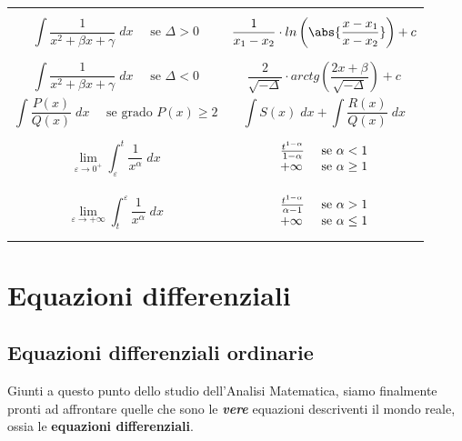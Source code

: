 \documentclass[a4paper, 12pt]{report}
\begin{document}
\begin{tabular}{m{} | m{}}
            
        \[ \int \frac{1}{x^2 + \beta x + \gamma}\; dx
        \quad \text{  se } \Delta > 0\] &
        \[ \frac{1}{x_1-x_2} \cdot ln \left ( \abs{\frac{x-x_1}{x-x_2}} \right )+c \]
        \\
        
            
        \[ \int \frac{1}{x^2 + \beta x + \gamma}\; dx
        \quad \text{ se } \Delta < 0\] &
        \[ \frac{2}{\sqrt{-\Delta}} \cdot arctg \left ( \frac{2x+ \beta}{\sqrt{-\Delta}}\right )+c \] \\
        
        \[\int \frac{P(x)}{Q(x)}\; dx
        \quad \text{ se grado } P(x) \geq 2\] &
        \[ \int S(x) \; dx + \int \frac{R(x)}{Q(x)} \; dx \] \\
        
        \[ \lim_{\varepsilon \to 0^+} \int_{\varepsilon}^{t} \frac{1}{x^{\alpha}} \; dx \] &
        $$
        \left . \begin{array}{l l}
                \frac{t^{1-\alpha}}{1-\alpha} & \text{ se } \alpha < 1 \\
                +\infty & \text{ se } \alpha \geq 1
        \end{array} \right .
        $$ \\
        
        \[ \lim_{\varepsilon \to +\infty} \int_{t}^{\varepsilon} \frac{1}{x^{\alpha}} \; dx \] &
        $$
        \left . \begin{array}{l l}
                \frac{t^{1-\alpha}}{\alpha-1} & \text{ se } \alpha > 1 \\
                +\infty & \text{ se } \alpha \leq 1
        \end{array} \right .
        $$
        
        \end{tabular}
        
        \newpage
        
        \chapter{Equazioni differenziali}
        
        \section{Equazioni differenziali ordinarie}
        
        Giunti a questo punto dello studio dell'Analisi Matematica, siamo finalmente pronti ad affrontare quelle che sono le \textbf{\textit{vere}} equazioni descriventi il mondo reale, ossia le \textbf{equazioni differenziali}.
        
\end{document}
